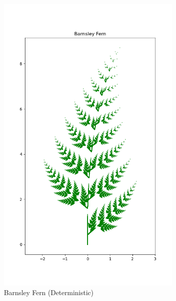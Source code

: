\documentclass[a4paper,11pt, titlepage]{article}
\theoremstyle{definition}
\theoremstyle{plain}
\theoremstyle{remark}
\theoremstyle{definition}
\begin{document}
\begin{figure}[h]
    \centering
    \begin{subfigure}[b]{0.45\textwidth}
        \centering
        \includegraphics[width=\textwidth]{barnsley_fern_deterministic.png}
        \caption{Barnsley Fern (Deterministic)}
        \label{fig:fern_deterministic}
    \end{subfigure}
    \hfill
    \begin{subfigure}[b]{0.45\textwidth}
        \centering

\end{subfigure}
\end{figure}
\end{document}
